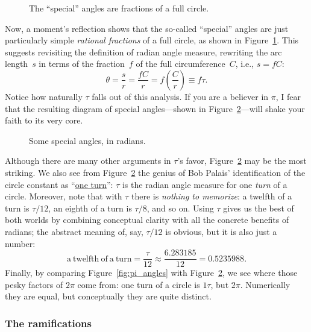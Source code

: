 \begin{figure}
\begin{center}
\end{center}
\caption{The ``special'' angles are fractions of a full circle.\label{fig:angle_fractions}}
\end{figure}

Now, a moment's reflection shows that the so-called ``special'' angles are just particularly simple \emph{rational fractions} of a full circle, as shown in Figure~\ref{fig:angle_fractions}. This suggests revisiting the definition of radian angle measure, rewriting the arc length~$s$ in terms of the fraction~$f$ of the full circumference~$C$, i.e., $s = f C$:
\[ \theta = \frac{s}{r} = \frac{fC}{r} =  f\left(\frac{C}{r}\right) \equiv f\tau. \]
 Notice how naturally $\tau$ falls out of this analysis. If you are a believer in $\pi$, I fear that the resulting diagram of special angles---shown in Figure~\ref{fig:tau_angles}---will shake your faith to its very core.

\begin{figure}
\begin{center}
\end{center}
\caption{Some special angles, in radians.\label{fig:tau_angles}}
\end{figure}

Although there are many other arguments in $\tau$'s favor, Figure~\ref{fig:tau_angles} may be the most striking. We also see from Figure~\ref{fig:tau_angles} the genius of Bob Palais' identification of the circle constant as ``\href{http://en.wikipedia.org/wiki/Turn_(geometry)}{one turn}'': $\tau$ is the radian angle measure for one \emph{turn} of a circle. Moreover, note that with $\tau$ there is \emph{nothing to memorize}: a twelfth of a turn is $\tau/12$, an eighth of a turn is $\tau/8$, and so on. Using $\tau$ gives us the best of both worlds by combining conceptual clarity with all the concrete benefits of radians; the abstract meaning of, say, $\tau/12$ is obvious, but it is also just a number:
\[
  \mathrm{a\ twelfth\ of\ a\ turn} = \frac{\tau}{12} \approx \frac{6.283185}{12} = 0.5235988.
\]
Finally, by comparing Figure~\ref{fig:pi_angles} with Figure~\ref{fig:tau_angles}, we see where those pesky factors of $2\pi$ come from: one turn of a circle is $1\tau$, but $2\pi$. Numerically they are equal, but conceptually they are quite distinct.

    \subsubsection{The ramifications} %
    \label{sec:the_ramifications}

